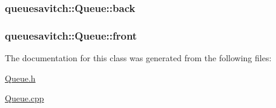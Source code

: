 \subsubsection[{\texorpdfstring{back}{back}}]{ queuesavitch\+::\+Queue\+::back\hspace{0.3cm}{\ttfamily [protected]}}\hypertarget{classqueuesavitch_1_1Queue_a2759a808c5c9abe7d1c53cc8ade3f5a9}{}\label{classqueuesavitch_1_1Queue_a2759a808c5c9abe7d1c53cc8ade3f5a9}
\subsubsection[{\texorpdfstring{front}{front}}]{ queuesavitch\+::\+Queue\+::front\hspace{0.3cm}{\ttfamily [protected]}}\hypertarget{classqueuesavitch_1_1Queue_ac30555d398c28ad9b72f9d9b05c1ddf6}{}\label{classqueuesavitch_1_1Queue_ac30555d398c28ad9b72f9d9b05c1ddf6}


The documentation for this class was generated from the following files\+:\begin{DoxyCompactItemize}
\item 
\hyperlink{Queue_8h}{Queue.\+h}\item 
\hyperlink{Queue_8cpp}{Queue.\+cpp}\end{DoxyCompactItemize}
